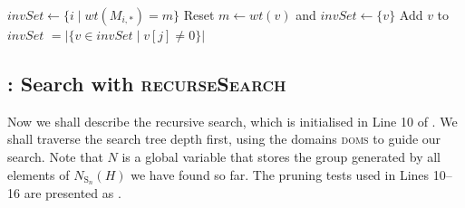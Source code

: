 \documentclass[11pt,a4paper]{article}
\theoremstyle{definition}
\theoremstyle{remark}
\newcommand{\Sy}{\mathrm{S}}
\begin{document}
\begin{algorithm}[ht!]
\begin{algorithmic}[1]
    \State $invSet \gets \{i \mid wt(M_{i,*}) = m \}$  
             Reset $m \gets wt(v)$ and $invSet \gets \{ v \}$ \EndIIf
             Add $v$ to $invSet$ \EndIIf
        \EndFor
    \EndFor 
    \State {}  \newline \hspace*{5em} $= |\{ v \in invSet \mid v[j] \neq 0\}|$
\EndProcedure
\end{algorithmic}
\end{algorithm}



\subsection*{: Search with \textsc{recurseSearch}}
\label{subsection: search}

Now we shall describe the recursive search, which is initialised in Line 10 of . We shall traverse the search tree depth first, using the domains \textsc{doms} to guide our search.
Note that $N$ is a global variable that stores the group generated by all elements of $N_{\Sy_n}(H)$ we have found so far. The pruning tests used in Lines 10--16 are presented as .
\end{document}
